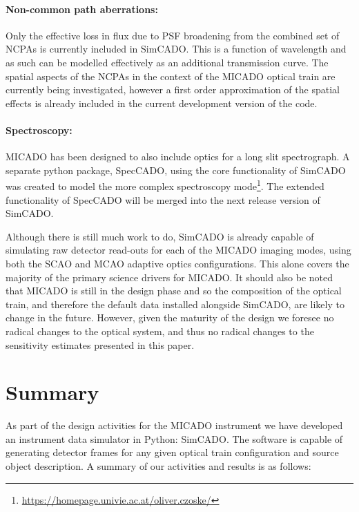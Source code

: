 \paragraph{Non-common path aberrations:} Only the effective loss in flux due to PSF broadening from the combined set of NCPAs is currently included in SimCADO. This is a function of wavelength and as such can be modelled effectively as an additional transmission curve. The spatial aspects of the NCPAs in the context of the MICADO optical train are currently being investigated, however a first order approximation of the spatial effects is already included in the current development version of the code.

\paragraph{Spectroscopy:} MICADO has been designed to also include optics for a long slit spectrograph. A separate python package, SpecCADO, using the core functionality of SimCADO was created to model the more complex spectroscopy mode\footnote{\url{https://homepage.univie.ac.at/oliver.czoske/}}. The extended functionality of SpecCADO will be merged into the next release version of SimCADO.

Although there is still much work to do, SimCADO is already capable of simulating raw detector read-outs for each of the MICADO imaging modes, using both the SCAO and MCAO adaptive optics configurations. This alone covers the majority of the primary science drivers for MICADO. It should also be noted that MICADO is still in the design phase and so the composition of the optical train, and therefore the default data installed alongside SimCADO, are likely to change in the future. However, given the maturity of the design we foresee no radical changes to the optical system, and thus no radical changes to the sensitivity estimates presented in this paper.


\section{Summary}
\label{sec:conclusions}

As part of the design activities for the MICADO instrument we have developed an instrument data simulator in Python: SimCADO. The software is capable of generating detector frames for any given optical train configuration and source object description. A summary of our activities and results is as follows:

